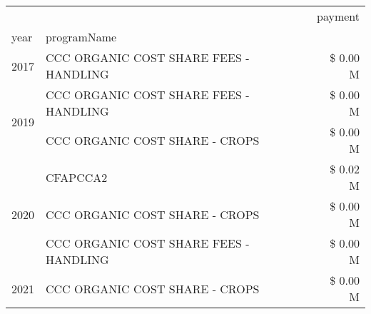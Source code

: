 \begin{tabular}{llr}
\toprule
 &  & payment \\
year & programName &  \\
\midrule
2017 & CCC ORGANIC COST SHARE FEES - HANDLING & \$ 0.00 M \\
\cline{1-3}
\multirow[t]{2}{*}{2019} & CCC ORGANIC COST SHARE FEES - HANDLING & \$ 0.00 M \\
 & CCC ORGANIC COST SHARE - CROPS & \$ 0.00 M \\
\cline{1-3}
\multirow[t]{3}{*}{2020} & CFAPCCA2 & \$ 0.02 M \\
 & CCC ORGANIC COST SHARE - CROPS & \$ 0.00 M \\
 & CCC ORGANIC COST SHARE FEES - HANDLING & \$ 0.00 M \\
\cline{1-3}
2021 & CCC ORGANIC COST SHARE - CROPS & \$ 0.00 M \\
\cline{1-3}
\bottomrule
\end{tabular}

